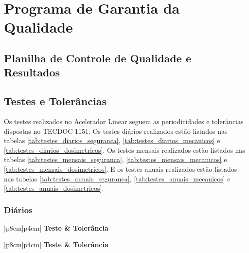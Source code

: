 \chapter{Programa de Garantia da Qualidade}
\label{ch:programa_garantia_qualidade}

\section{Planilha de Controle de Qualidade e Resultados}
\label{sec:planilhas}


\clearpage
\section{Testes e Tolerâncias}
\label{sec:teste_tolerancia}
Os testes realizados no Acelerador Linear seguem as periodicidades e tolerâncias dispostas no TECDOC 1151. Os testes diários realizados estão listados nas tabelas \ref{tab:testes_diarios_seguranca}, \ref{tab:testes_diarios_mecanicos} e \ref{tab:testes_diarios_dosimetricos}.  Os testes mensais realizados estão listados nas tabelas \ref{tab:testes_mensais_seguranca}, \ref{tab:testes_mensais_mecanicos} e \ref{tab:testes_mensais_dosimetricos}. E  os testes anuais realizados estão listados nas tabelas \ref{tab:testes_anuais_seguranca}, \ref{tab:testes_anuais_mecanicos} e \ref{tab:testes_anuais_dosimetricos}.
\vfill

\pagebreak
\subsection{Diários}

\begin{table}[!h]
    \centering
    \begin{NiceTabular}{|p{8cm}|p{4cm}|}\hline%
        \color{white}\bfseries Teste & \color{white}\bfseries Tolerância \\\hline\hline
        \hline
    \end{NiceTabular}
    \caption{Testes diários de segurança.}
    \label{tab:testes_diarios_seguranca}
\end{table}

\begin{table}[!h]
    \centering
    \begin{NiceTabular}{|p{8cm}|p{4cm}|}\hline%
        \color{white}\bfseries Teste & \color{white}\bfseries Tolerância \\\hline\hline
        \hline
    \end{NiceTabular}
    \caption{Testes diários dosimétricos.}
    \label{tab:testes_diarios_dosimetricos}
\end{table}

